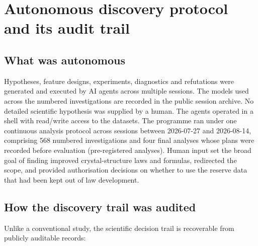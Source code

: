 \section{Autonomous discovery protocol and its audit trail}\label{note:s1}

\subsection{What was autonomous}\label{s1.1-what-was-autonomous}

Hypotheses, feature designs, experiments, diagnostics and refutations were generated
and executed by AI agents across multiple sessions. The models used across the numbered investigations are recorded in the public session
archive.
No detailed scientific hypothesis was supplied by a human. The agents operated in a
shell with read/write access to the datasets. The programme ran under one continuous analysis protocol across sessions between
2026-07-27 and 2026-08-14, comprising 568 numbered investigations and four final
analyses whose plans were recorded before evaluation (pre-registered analyses). Human
input set the broad goal of finding improved crystal-structure laws and formulas,
redirected the scope, and provided authorisation
decisions on whether to use the reserve data that had been kept out of law development.

\subsection{How the discovery trail was audited}\label{s1.2-the-audit-trail}

Unlike a conventional study, the scientific decision trail is recoverable from
publicly auditable records:

